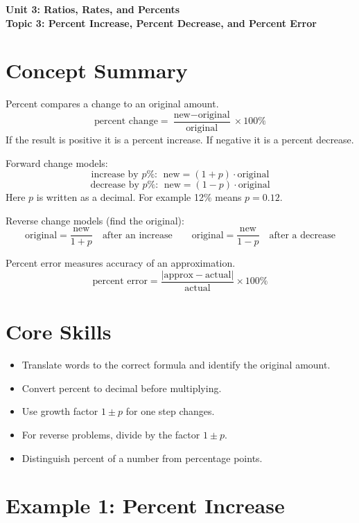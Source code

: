 \documentclass[12pt]{article}
\begin{document}
\begin{center}
    \LARGE \textbf{Unit 3: Ratios, Rates, and Percents} \\[6pt]
    \Large \textbf{Topic 3: Percent Increase, Percent Decrease, and Percent Error}
\end{center}

\vspace{1em}

\section*{Concept Summary}

Percent compares a change to an original amount.  
\[
\text{percent change}=\frac{\text{new} - \text{original}}{\text{original}}\times 100\%
\]
If the result is positive it is a percent increase. If negative it is a percent decrease.

Forward change models:
\[
\text{increase by }p\%:\ \ \text{new}=(1+p)\cdot \text{original}
\]
\[
\text{decrease by }p\%:\ \ \text{new}=(1-p)\cdot \text{original}
\]
Here \(p\) is written as a decimal. For example 12\% means \(p=0.12\).

Reverse change models (find the original):
\[
\text{original}=\frac{\text{new}}{1+p}\quad \text{after an increase}
\qquad
\text{original}=\frac{\text{new}}{1-p}\quad \text{after a decrease}
\]

Percent error measures accuracy of an approximation.
\[
\text{percent error}=\frac{|\text{approx} - \text{actual}|}{\text{actual}}\times 100\%
\]

\section*{Core Skills}
\begin{itemize}
  \item Translate words to the correct formula and identify the original amount.
  \item Convert percent to decimal before multiplying.
  \item Use growth factor \(1\pm p\) for one step changes.
  \item For reverse problems, divide by the factor \(1\pm p\).
  \item Distinguish percent of a number from percentage points.
\end{itemize}

\section*{Example 1: Percent Increase}
\end{document}
